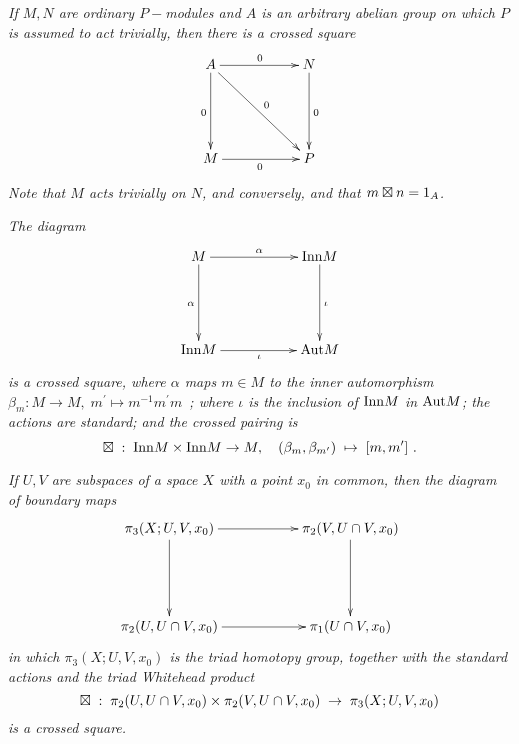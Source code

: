 \medskip
\begin{example}
\emph{If $M, N$ are ordinary $P-$modules and $A$ is an arbitrary abelian group
on which $P$ is assumed to act trivially, 
then there is a crossed square}
$$
\xymatrix{
A \ar[rr]^{0} \ar[dd]_{0} \ar[rrdd]^{0}  
  && N \ar[dd]^{0} \\
  &&               \\
M \ar[rr]_{0} 
  && P 
}
$$
\emph{Note that $M$ acts trivially on $N$, and conversely, 
and that $m \boxtimes n = 1_A$.} 
\end{example}

\medskip
\begin{example}
\emph{The diagram}
$$
\xymatrix{
M \ar[rr]^{\alpha} \ar[dd]_{\alpha}  && \Inn M \ar[dd]^{\iota} \\
       \\
\Inn M \ar[rr]_{\iota}  && \Aut M 
}
$$
\emph{is a crossed square, 
where $\alpha$ maps $m \in M$
to the inner automorphism  $\beta_m : M \to M,\; 
m^{\prime} \mapsto m^{-1}m^{\prime}m$~; 
where $\iota$ is the inclusion of $\mathrm{Inn} M$  in  $\mathrm{Aut} M$;
the actions are standard; and the crossed pairing is}
$$
\boxtimes \;:\; \mathrm{Inn} M \times \mathrm{Inn} M \to M, \quad
(\beta_m, \beta_{m^{\prime}}) \;\mapsto\; [m, m^{\prime}]~.
$$
\end{example}

\medskip
\begin{example}
\emph{If $U, V$ are subspaces of a space $X$ with a point $x_0$ in common, 
then the diagram of boundary maps}
$$
\xymatrix{
\pi_3(X;U,V, x_0) \ar[rr] \ar[dd]  && \pi_2(V, U \cap V, x_0) \ar[dd] \\
       \\
\pi_2(U, U \cap V, x_0) \ar[rr] && \pi_1(U \cap V, x_0) 
}
$$
\emph{in which $\pi_3(X;U,V,x_0)$ is the triad homotopy group, 
together with the standard actions and the triad Whitehead product
$$
\boxtimes \;:\; 
 \pi_2(U, U \cap V, x_0) \times \pi_2(V, U \cap V, x_0) 
 \;\to\; \pi_3(X;U, V, x_0)
$$
is a crossed square.}
\end{example}

